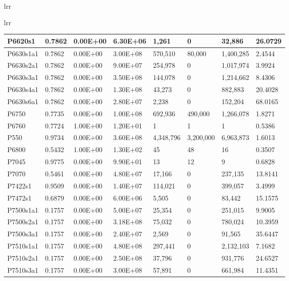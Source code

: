 \begin{table}[H]
\begin{tabular}{lrr}
\begin{table}[!ht]
\begin{tabular}{lrr}
\begin{tabular}{|l|l|l|l|l|l|l|l|}
        P6620s1 & 0.7862 & 0.00E+00 & 6.30E+06 & 1,261 & 0 & 32,886 & 26.0729 \\ \hline
        P6630s1a1 & 0.7862 & 0.00E+00 & 3.00E+08 & 570,510 & 80,000 & 1,400,285 & 2.4544 \\ \hline
        P6630s2a1 & 0.7862 & 0.00E+00 & 9.00E+07 & 254,978 & 0 & 1,017,974 & 3.9924 \\ \hline
        P6630s3a1 & 0.7862 & 0.00E+00 & 3.50E+08 & 144,078 & 0 & 1,214,662 & 8.4306 \\ \hline
        P6630s4a1 & 0.7862 & 0.00E+00 & 1.30E+08 & 43,273 & 0 & 882,883 & 20.4028 \\ \hline
        P6630s6a1 & 0.7862 & 0.00E+00 & 2.80E+07 & 2,238 & 0 & 152,204 & 68.0165 \\ \hline
        P6750 & 0.7735 & 0.00E+00 & 1.00E+08 & 692,936 & 490,000 & 1,266,078 & 1.8271 \\ \hline
        P6760 & 0.7724 & 1.00E+00 & 1.20E+01 & 1 & 1 & 1 & 0.5386 \\ \hline
        P550 & 0.9734 & 0.00E+00 & 3.60E+08 & 4,348,796 & 3,200,000 & 6,963,873 & 1.6013 \\ \hline
        P6800 & 0.5432 & 1.00E+00 & 1.30E+02 & 45 & 48 & 16 & 0.3507 \\ \hline
        P7045 & 0.9775 & 0.00E+00 & 9.90E+01 & 13 & 12 & 9 & 0.6828 \\ \hline
        P7070 & 0.5461 & 0.00E+00 & 4.80E+07 & 17,166 & 0 & 237,135 & 13.8141 \\ \hline
        P7422s1 & 0.9509 & 0.00E+00 & 1.40E+07 & 114,021 & 0 & 399,057 & 3.4999 \\ \hline
        P7472s1 & 0.6879 & 0.00E+00 & 6.00E+06 & 5,505 & 0 & 83,442 & 15.1575 \\ \hline
        P7500s1a1 & 0.1757 & 0.00E+00 & 5.00E+07 & 25,354 & 0 & 251,015 & 9.9005 \\ \hline
        P7500s2a1 & 0.1757 & 0.00E+00 & 3.18E+08 & 75,032 & 0 & 780,024 & 10.3959 \\ \hline
        P7500s3a1 & 0.1757 & 0.00E+00 & 2.40E+07 & 2,569 & 0 & 91,565 & 35.6447 \\ \hline
        P7510s1a1 & 0.1757 & 0.00E+00 & 4.80E+08 & 297,441 & 0 & 2,132,103 & 7.1682 \\ \hline
        P7510s2a1 & 0.1757 & 0.00E+00 & 2.50E+08 & 37,796 & 0 & 931,776 & 24.6527 \\ \hline
        P7510s3a1 & 0.1757 & 0.00E+00 & 3.00E+08 & 57,891 & 0 & 661,984 & 11.4351 \\ \hline

\end{tabular}
\end{tabular}
\end{table}
\end{tabular}
\end{table}
